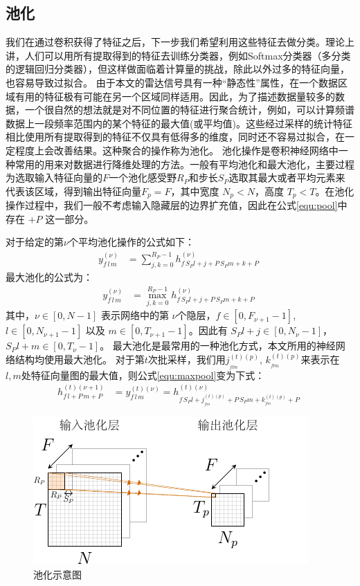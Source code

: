 \subsection{池化}
我们在通过卷积获得了特征之后，下一步我们希望利用这些特征去做分类。理论上讲，人们可以用所有提取得到的特征去训练分类器，例如Softmax分类器（多分类的逻辑回归分类器），但这样做面临着计算量的挑战，除此以外过多的特征向量，也容易导致过拟合。
由于本文的雷达信号具有一种“静态性”属性，在一个数据区域有用的特征极有可能在另一个区域同样适用。因此，为了描述数据量较多的数据，一个很自然的想法就是对不同位置的特征进行聚合统计，例如，可以计算频谱数据上一段频率范围内的某个特征的最大值(或平均值)。这些经过采样的统计特征相比使用所有提取得到的特征不仅具有低得多的维度，同时还不容易过拟合，在一定程度上会改善结果。这种聚合的操作称为池化。
池化操作是卷积神经网络中一种常用的用来对数据进行降维处理的方法。一般有平均池化和最大池化，主要过程为选取输入特征向量的$F$一个池化感受野$R_P$和步长$S_P$选取其最大或者平均元素来代表该区域，得到输出特征向量$F_p=F$，其中宽度 $N_p<N$，高度 $T_p<T$。在池化操作过程中，我们一般不考虑输入隐藏层的边界扩充值，因此在公式\ref{equ:pool}中存在 $+P$ 这一部分。

对于给定的第$\nu$个平均池化操作的公式如下：
\begin{align}
y_{f\,l\,m}^{(\nu)}&=\sum^{R_P-1}_{j,k=0} h_{f\,S_P l+j+P\,S_Pm+k+P}^{(\nu)}\;
\label{equ:pool}
\end{align}
最大池化的公式为：
\begin{align}
y_{f\,l\,m}^{(\nu)}&=\max^{R_P-1}_{j,k=0} h_{f\,S_P l+j+P\,S_Pm+k+P}^{(\nu)}\;
\label{equ:maxpool}
\end{align}
其中，$\nu \in [0,N-1 ]$ 表示网络中的第 $\nu$个隐层，$f\in[0,F_{\nu+1}-1]$, $l\in[0,N_{\nu+1}-1 ]$ 以及 $m\in[0,T_{\nu+1}-1 ]$。因此有 $S_Pl+j\in[0,N_\nu-1 ]$， $S_Pl+m\in[0,T_\nu-1 ]$。
最大池化是最常用的一种池化方式，本文所用的神经网络结构均使用最大池化。
对于第$t$次批采样，我们用$j^{(t)(p)}_{_{flm}},\,k^{(t)(p)}_{_{flm}}$来表示在 $l,m$处特征向量图的最大值，则公式\ref{equ:maxpool}变为下式：
\begin{align}
h_{f\,l+P\,m+P}^{(t)(\nu+1)}&=y_{f\,l\,m}^{(t)(\nu)}=
%
h^{(t)(\nu)}_{f\,S_P l+j^{(t)(p)}_{_{flm}}+P\,S_Pm+k^{(t)(p)}_{_{flm}}+P}\;
\end{align}

\begin{figure}[!t]
	\centering
	\includegraphics[width=\textwidth]{figures/networks/pool}
	\caption{池化示意图}
	\label{fig:pool}
\end{figure}

